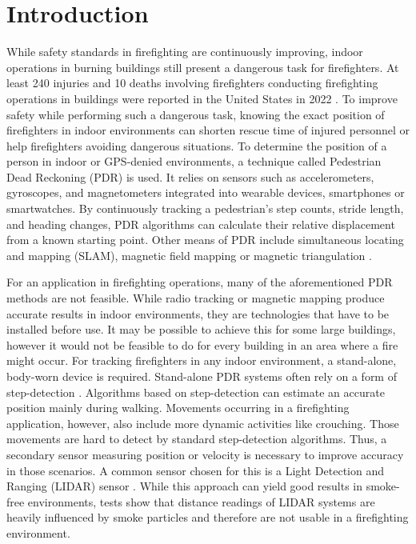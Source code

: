 \documentclass[engproc,conferenceproceedings,submit,pdftex,moreauthors]{Definitions/mdpi}
\begin{document}

\section{Introduction}

While safety standards in firefighting are continuously improving, indoor operations in burning buildings still present a dangerous task for firefighters. At least 240 injuries and 10 deaths involving firefighters conducting firefighting operations in buildings were reported in the United States in 2022 \cite{atemschutzunfalle.eu2023}. To improve safety while performing such a dangerous task, knowing the exact position of firefighters in indoor environments can shorten rescue time of injured personnel or help firefighters avoiding dangerous situations. To determine the position of a person in indoor or GPS-denied environments, a technique called Pedestrian Dead Reckoning (PDR) is used. It relies on sensors such as accelerometers, gyroscopes, and magnetometers integrated into wearable devices, smartphones or smartwatches. By continuously tracking a pedestrian's step counts, stride length, and heading changes, PDR algorithms can calculate their relative displacement from a known starting point. Other means of PDR include simultaneous locating and mapping (SLAM)\cite{lu2019}, magnetic field mapping \cite{wang2016} or magnetic triangulation \cite{arumugam2020}.

For an application in firefighting operations, many of the aforementioned PDR methods are not feasible. While radio tracking \cite{cong2023} or magnetic mapping \cite{wang2016} produce accurate results in indoor environments, they are technologies that have to be installed before use. It may be possible to achieve this for some large buildings, however it would not be feasible to do for every building in an area where a fire might occur. For tracking firefighters in any indoor environment, a stand-alone, body-worn device is required. Stand-alone PDR systems often rely on a form of step-detection \cite{hou2021}. Algorithms based on step-detection can estimate an accurate position mainly  during walking. Movements occurring in a firefighting application, however, also include more dynamic activities like crouching. Those movements are hard to detect by standard step-detection algorithms. Thus, a secondary sensor measuring position or velocity is necessary to improve accuracy in those scenarios. A common sensor chosen for this is a Light Detection and Ranging (LIDAR) sensor \cite{wang2016}. While this approach can yield good results in smoke-free environments, tests show that distance readings of LIDAR systems are heavily influenced by smoke particles and therefore are not usable in a firefighting environment.
\end{document}
